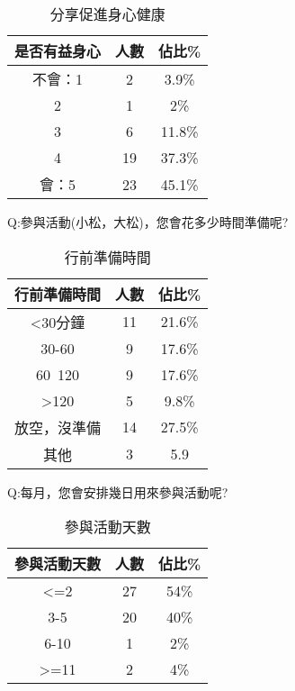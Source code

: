 \begin{center} 
\begin{table}[h]
\centering
\caption{分享促進身心健康}
\label{4_1_health}
\begin{tabular}{ccc} \hline
是否有益身心&	人數 &	佔比\% \\ \hline
不會：1&	2&	3.9\% \\ \hline
2	&1	&2\% \\ \hline
3	&6	&11.8\% \\ \hline
4	&19	&37.3\% \\ \hline
會：5&	23&	45.1\% \\ \hline
\end{tabular}
\end{table}
\end{center}










Q:參與活動(小松，大松)，您會花多少時間準備呢?

\begin{center} 
\begin{table}[h]
\centering
\caption{行前準備時間}
\label{4_1_time}
\begin{tabular}{ccc} \hline
行前準備時間&	人數 &	佔比\% \\ \hline
<30分鐘	&11	&21.6\% \\ \hline
30-60	&9	&17.6\% \\ \hline
60~120	&9	&17.6\% \\ \hline
>120	&5	&9.8\% \\ \hline
放空，沒準備	&14&	27.5\% \\ \hline
其他	&3	&5.9%
\end{tabular}
\end{table}
\end{center}





Q:每月，您會安排幾日用來參與活動呢?

\begin{center} 
\begin{table}[h]
\centering
\caption{參與活動天數}
\label{4_1_day}
\begin{tabular}{ccc} \hline
參與活動天數&	人數 &	佔比\% \\ \hline
<=2	&27	&54\% \\ \hline
3-5	&20	&40\% \\ \hline
6-10&	1&	2\% \\ \hline
>=11&	2&	4\% \\ \hline 
\end{tabular}
\end{table}
\end{center}





